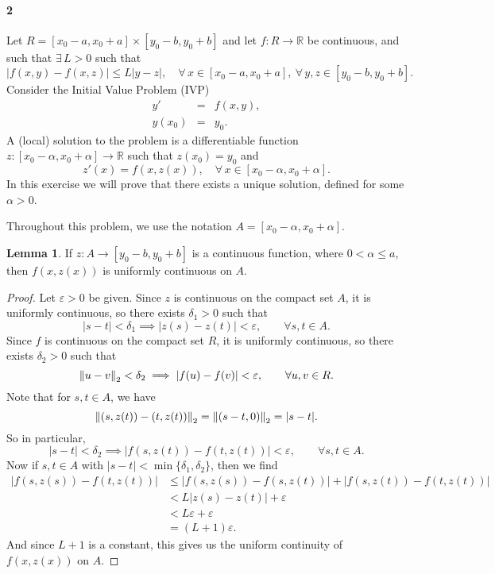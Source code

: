 \documentclass[12pt]{article}
\newenvironment{fullbox}{\begin{lrbox}{\savefullbox}\begin{minipage}{\dimexpr\textwidth-2\fboxsep\relax}}{\end{minipage}\end{lrbox}\begin{center}\framebox[\textwidth]{\usebox{\savefullbox}}\end{center}}
\newenvironment{pbox}[1][]{\begin{fullbox}\ifx#1\empty\else\paragraph{#1}\fi}{\end{fullbox}}
\theoremstyle{definition}
\newtheorem{lemma}{Lemma}
\newcommand{\R}{\mathbb{R}}
\newcommand{\eps}{\varepsilon}
\begin{document}
\newpage
\begin{pbox}[2]
    Let $R=[x_0-a,x_0+a]\times [y_0-b,y_0+b]$ and let $f:R\to \R$ be continuous, and such that $\exists\, L>0$ such that 
    \begin{equation}\label{eqn:lipschitz}
    |f(x,y)-f(x,z)|\le L|y-z|,\quad \forall\, x\in [x_0-a,x_0+a],\ \forall\, y, z\in [y_0-b,y_0+b]. 
    \end{equation}
    Consider the Initial Value Problem (IVP)
    \begin{eqnarray}\label{eqn:IVP}
    y' &=& f(x,y),\\
    y(x_0) &=& y_0.
    \end{eqnarray}
    A (local) solution to the problem is a differentiable function $z:[x_0-\alpha,x_0+\alpha]\to \R$ such that $z(x_0) = y_0$ and 
    \begin{equation}
    z'(x) = f(x,z(x)),\quad \forall\, x\in [x_0-\alpha,x_0+\alpha].
    \end{equation}
    In this exercise we will prove that there exists a unique solution, defined for some $\alpha>0$. 
\end{pbox}

\noindent
Throughout this problem, we use the notation $A = [x_0-\alpha,x_0+\alpha]$.

\begin{lemma}
    If $z : A \to  [y_0-b,y_0+b]$ is a continuous function, where $0 < \alpha \leq a$, then $f(x, z(x))$ is uniformly continuous on $A$.
\end{lemma}

\begin{proof}
    Let $\eps > 0$ be given. Since $z$ is continuous on the compact set $A$, it is uniformly continuous, so there exists $\delta_1 > 0$ such that
    \[
        |s - t| < \delta_1 \implies |z(s) - z(t)| < \eps, \qquad \forall s, t \in A.
    \]
    Since $f$ is continuous on the compact set $R$, it is uniformly continuous, so there exists $\delta_2 > 0$ such that
    \[
        \norm{u - v}_2 < \delta_2 \implies |f(u) - f(v)| < \eps, \qquad \forall u, v \in R.
    \]
    Note that for $s, t \in A$, we have
    \[
        \norm{(s, z(t)) - (t, z(t))}_2
            = \norm{(s - t, 0)}_2 
            = |s - t|.
    \]
    So in particular,
    \[
        |s-t| < \delta_2 \implies |f(s, z(t)) - f(t, z(t))| < \eps, \qquad \forall s, t \in A.
    \]
    Now if $s, t \in A$ with $|s - t| < \min\{\delta_1, \delta_2\}$, then we find
    \begin{align*}
        |f(s, z(s)) - f(t, z(t))|
            &\leq |f(s, z(s)) - f(s, z(t))| + |f(s, z(t)) - f(t, z(t))| \\
            &< L|z(s) - z(t)| + \eps \\
            &< L\eps + \eps \\
            &= (L+1)\eps.
    \end{align*}
    And since $L+1$ is a constant, this gives us the uniform continuity of $f(x, z(x))$ on $A$.
    
\end{proof}
\end{document}
